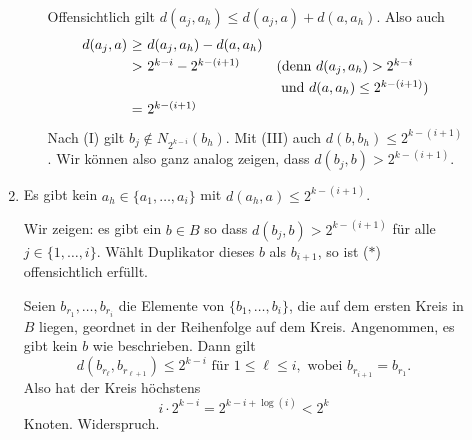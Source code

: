 \documentclass[fontsize=11pt, twoside=false, numbers=autoenddot]{scrbook}
\begin{document}
\begin{beweis}
\begin{description}
\begin{enumerate}
\begin{enumerate}

            Offensichtlich gilt $d(a_j,a_h) \leq d(a_j,a) + d(a,a_h)$.
            Also auch 
            \[
              \begin{array}{r@{~}c@{~}ll}
                d(a_j,a) & \geq & d(a_j,a_h) - d(a,a_h) \\[1mm]
                         & >    & 2^{k-i} - 2^{k-(i+1)} & \text{(denn $d(a_j,a_h) > 2^{k-i}$} \\[1mm]
                         &      &                       & \text{~und $d(a,a_h) \leq 2^{k-(i+1)}$)} \\[1mm]
                         & =    & 2^{k-(i+1)}
              \end{array}
            \]
            Nach
            (I) gilt $b_j \notin N_{2^{k-i}}(b_h)$. Mit (III) auch $d(b,b_h) \leq 2^{k-(i+1)}$.
            Wir k\"onnen also ganz analog zeigen, dass $d(b_j,b) > 2^{k-(i+1)}$.
        \end{enumerate}

      \item
        Es gibt kein $a_h \in \{a_1,\dots,a_i\}$ mit $d(a_h,a) \leq 2^{k-(i+1)}$. 

        Wir zeigen: es gibt ein $b \in B$ so dass $d(b_j,b) >
        2^{k-(i+1)}$ f\"ur alle $j \in \{1,\dots,i\}$. W\"ahlt Duplikator dieses $b$ als $b_{i+1}$,
        so ist ($*$) offensichtlich erf\"ullt.

        Seien $b_{r_1},\dots,b_{r_i}$ die Elemente von $\{b_1,\dots,b_i\}$,
        die auf dem ersten Kreis in $B$ liegen, geordnet in der Reihenfolge
        auf dem Kreis.  Angenommen, es gibt kein $b$ wie beschrieben. Dann gilt
        \[
          d(b_{r_\ell},b_{r_{\ell+1}}) \leq 2^{k-i} \text{ f\"ur } 1 \leq \ell \leq i, \text{ wobei }
          b_{r_{i+1}}=b_{r_1}.
        \]
        Also hat der Kreis h\"ochstens
        \[
          i \cdot  2^{k-i} = 2^{k-i+\log(i)} < 2^k
        \]
        Knoten. Widerspruch.
        \qedhere
      \end{enumerate}
  \end{description}
\end{beweis}%
\end{document}

